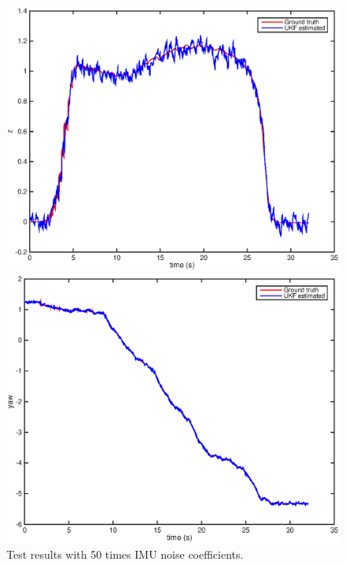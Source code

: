 \documentclass[letter, 10pt]{article}
\begin{document}
\begin{onehalfspacing}
\begin{figure}[h]
\begin{minipage}{.25\textwidth}
    		\includegraphics[width=1\linewidth]{q_z.eps}
	\end{minipage}%
	\begin{minipage}{.25\textwidth}  
		\centering
    		\includegraphics[width=1\linewidth]{q_yaw.eps}
	\end{minipage}
	\centering
	\caption{Test results with 50 times IMU noise coefficients.}
	\label{highq}
\end{figure}


\end{onehalfspacing}
\end{document}
